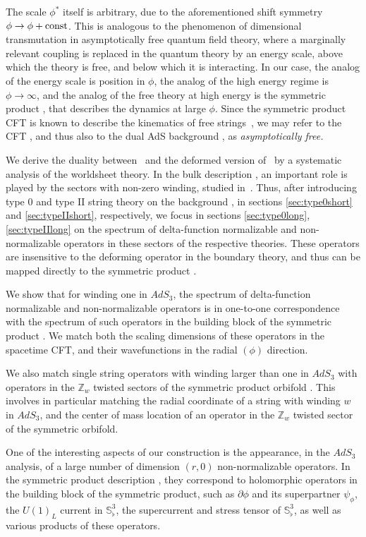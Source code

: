 \documentclass[12pt]{article}
\def\sqsphere{{\bS^3_\flat}}
\newcommand{\bS}{{\mathbb S}}
\newcommand{\bZ}{{\mathbb Z}}
\numberwithin{equation}{section}
\begin{document}
The scale $\phi^*$ itself is arbitrary, due to the aforementioned shift symmetry $\phi\to\phi+{\rm const}$. This is analogous to the phenomenon of dimensional transmutation in asymptotically free quantum field theory, where a marginally relevant coupling is replaced in the quantum theory by an energy scale, above which the theory is free, and below which it is interacting. In our case, the analog of the energy scale is position in $\phi$, the analog of the high energy regime is $\phi\to\infty$, and the analog of the free theory at high energy is the symmetric product \ourcft, that describes the dynamics at large $\phi$. Since the symmetric product CFT is known to describe the kinematics of free strings~, we may refer to the CFT \ourcft, and thus also to the dual AdS background \ourads, as {\it asymptotically free.}

We derive the duality between \ourads\ and the deformed version of \ourcft\ by a systematic analysis of the worldsheet theory.  In the bulk description \ourads, an important role is played by the sectors with non-zero winding, studied in~. Thus, after introducing type 0 and type II string theory on the background \ourads, in sections \ref{sec:type0short} and \ref{sec:typeIIshort}, respectively, we focus in sections \ref{sec:type0long}, \ref{sec:typeIIlong} on the spectrum of delta-function normalizable and non-normalizable operators in these sectors of the respective theories. These operators are insensitive to the deforming operator in the boundary theory, and thus can be mapped directly to the symmetric product \ourcft.  

We show that for winding one in $AdS_3$, the spectrum of delta-function normalizable and non-normalizable operators is in one-to-one correspondence with the spectrum of such operators in the building block of the symmetric product \ourcft. We match both the scaling dimensions of these operators in the spacetime CFT, and their wavefunctions in the radial $(\phi)$ direction.  

We also match single string operators with winding larger than one in $AdS_3$ with operators in the $\bZ_w$ twisted sectors of the symmetric product orbifold \ourcft. This involves in particular matching the radial coordinate of a string with winding $w$ in $AdS_3$, and the center of mass location of an operator in the $\bZ_w$ twisted sector of the symmetric orbifold.

One of the interesting aspects of our construction is the appearance, in the $AdS_3$ analysis, of a large number of dimension $(r,0)$ non-normalizable operators. In the symmetric product description \ourcft, they correspond to holomorphic operators in the building block of the symmetric product, such as $\partial\phi$ and its superpartner $\psi_\phi$, the $U(1)_L$ current in $\sqsphere$, the supercurrent and stress tensor of $\bS^3_\flat$, as well as various products of these operators. 
\end{document}
